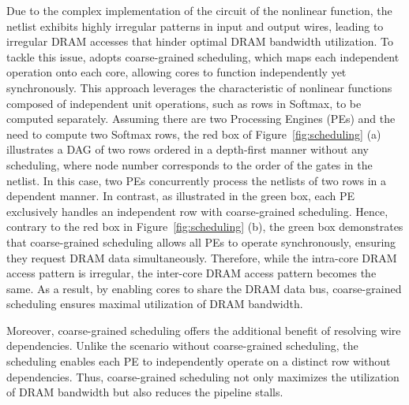 Due to the complex implementation of the circuit of the nonlinear function, the netlist exhibits highly irregular patterns in input and output wires, leading to irregular DRAM accesses that hinder optimal DRAM bandwidth utilization.
To tackle this issue, \sysname adopts coarse-grained scheduling, which maps each independent operation onto each core, allowing cores to function independently yet synchronously. This approach leverages the characteristic of nonlinear functions composed of independent unit operations, such as rows in Softmax, to be computed separately. 
Assuming there are two Processing Engines (PEs) and the need to compute two Softmax rows, the red box of Figure~\ref{fig:scheduling} (a) illustrates a DAG of two rows ordered in a depth-first manner without any scheduling, where node number corresponds to the order of the gates in the netlist. In this case, two PEs concurrently process the netlists of two rows in a dependent manner. In contrast, as illustrated in the green box, each PE exclusively handles an independent row with coarse-grained scheduling. Hence, contrary to the red box in Figure~\ref{fig:scheduling} (b), the green box demonstrates that coarse-grained scheduling allows all PEs to operate synchronously, ensuring they request DRAM data simultaneously. Therefore, while the intra-core DRAM access pattern is irregular, the inter-core DRAM access pattern becomes the same. As a result, by enabling cores to share the DRAM data bus, coarse-grained scheduling ensures maximal utilization of DRAM bandwidth.

Moreover, coarse-grained scheduling offers the additional benefit of resolving wire dependencies. Unlike the scenario without coarse-grained scheduling, the scheduling enables each PE to independently operate on a distinct row without dependencies. Thus, coarse-grained scheduling not only maximizes the utilization of DRAM bandwidth but also reduces the pipeline stalls.
        

